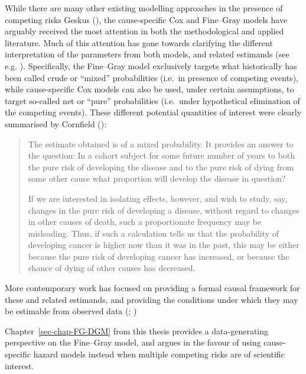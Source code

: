 \documentclass[
  letterpaper,
  DIV=11,
  numbers=noendperiod]{scrreprt}
\begin{document}
While there are many other existing modelling approaches in the presence
of competing risks Geskus
(), the
cause-specific Cox and Fine--Gray models have arguably received the most
attention in both the methodological and applied literature. Much of
this attention has gone towards clarifying the different interpretation
of the parameters from both models, and related estimands (see e.g.
). Specifically, the Fine--Gray model exclusively
targets what historically has been called crude or ``mixed''
probabilities (i.e.~in presence of competing events), while
cause-specific Cox models can also be used, under certain assumptions,
to target so-called net or ``pure'' probabilities (i.e.~under
hypothetical elimination of the competing events). These different
potential quantities of interest were clearly summarised by Cornfield
():

\begin{quote}
The estimate obtained is of a mixed probability. It provides an answer
to the question: In a cohort subject for some future number of years to
both the pure risk of developing the disease and to the pure risk of
dying from some other cause what proportion will develop the disease in
question?

If we are interested in isolating effects, however, and wish to study,
say, changes in the pure risk of developing a disease, without regard to
changes in other causes of death, such a proportionate frequency may be
misleading. Thus, if such a calculation tells us that the probability of
developing cancer is higher now than it was in the past, this may be
either because the pure risk of developing cancer has increased, or
because the chance of dying of other causes has decreased.
\end{quote}

More contemporary work has focused on providing a formal causal
framework for these and related estimands, and providing the conditions
under which they may be estimable from observed data
(;
)

Chapter~\ref{sec-chap-FG-DGM} from this thesis provides a
data-generating perspective on the Fine--Gray model, and argues in the
favour of using cause-specific hazard models instead when multiple
competing risks are of scientific interest.
\end{document}
